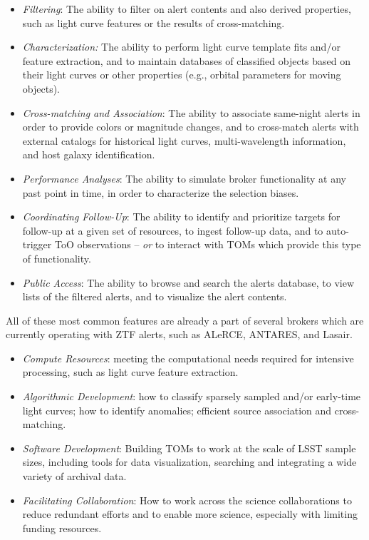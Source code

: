 \medskip
{}
\begin{itemize}
\item {\it Filtering}: The ability to filter on alert contents and also derived properties, such as light curve features or the results of cross-matching.
\item {\it Characterization:} The ability to perform light curve template fits and/or feature extraction, and to maintain databases of classified objects based on their light curves or other properties (e.g., orbital parameters for moving objects).
\item {\it Cross-matching and Association}: The ability to associate same-night alerts in order to provide colors or magnitude changes, and to cross-match alerts with external catalogs for historical light curves, multi-wavelength information, and host galaxy identification.
\item {\it Performance Analyses}: The ability to simulate broker functionality at any past point in time, in order to characterize the selection biases.
\item {\it Coordinating Follow-Up}: The ability to identify and prioritize targets for follow-up at a given set of resources, to ingest follow-up data, and to auto-trigger ToO observations -- {\it or} to interact with TOMs which provide this type of functionality. 
\item {\it Public Access}: The ability to browse and search the alerts database, to view lists of the filtered alerts, and to visualize the alert contents.
\end{itemize}

All of these most common features are already a part of several brokers which are currently operating with  {ZTF} alerts, such as ALeRCE,  {ANTARES}, and Lasair.

\medskip
{}
\begin{itemize}
\item {\it Compute Resources}: meeting the computational needs required for intensive processing, such as light curve feature extraction.
\item {\it Algorithmic Development}: how to classify sparsely sampled and/or early-time light curves; how to identify anomalies; efficient source association and cross-matching.
\item {\it Software Development}: Building TOMs to work at the scale of  {LSST} sample sizes, including tools for data visualization, searching and integrating a wide variety of archival data.
\item {\it Facilitating Collaboration}: How to work across the science collaborations to reduce redundant efforts and to enable more science, especially with limiting funding resources.
\end{itemize}




